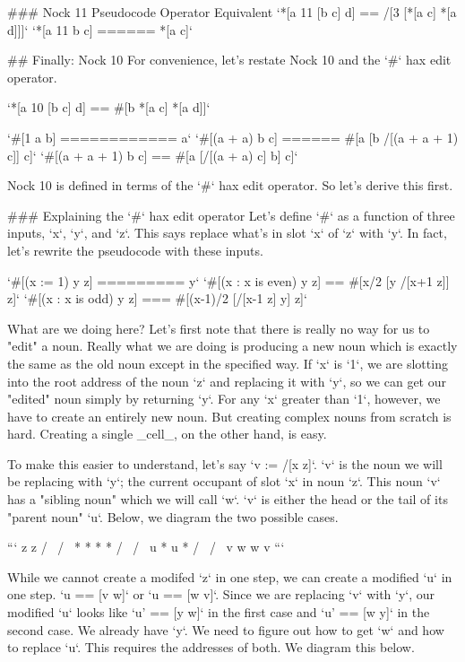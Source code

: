 \documentclass[twoside]{article}
\begin{document}
### Nock 11 Pseudocode Operator Equivalent
`*[a 11 [b c] d] == /[3 [*[a c] *[a d]]]`  
`*[a 11 b c] ====== *[a c]`

## Finally: Nock 10
For convenience, let's restate Nock 10 and the `#` hax edit operator.

`*[a 10 [b c] d] ==  #[b *[a c] *[a d]]`  

`#[1 a b] ============ a`  
`#[(a + a) b c] ====== #[a [b /[(a + a + 1) c]] c]`  
`#[(a + a + 1) b c] == #[a [/[(a + a) c] b] c]`  

Nock 10 is defined in terms of the `#` hax edit operator. So let's derive this first.

### Explaining the `#` hax edit operator
Let's define `#` as a function of three inputs, `x`, `y`, and `z`. This says replace what's in slot `x` of `z` with `y`. In fact, let's rewrite the pseudocode with these inputs.

`#[(x := 1) y z] ========= y`  
`#[(x : x is even) y z] == #[x/2 [y /[x+1 z]] z]`  
`#[(x : x is odd) y z] === #[(x-1)/2 [/[x-1 z] y] z]`  


What are we doing here? Let's first note that there is really no way for us to "edit" a noun. Really what we are doing is producing a new noun which is exactly the same as the old noun except in the specified way. If `x` is `1`, we are slotting into the root address of the noun `z` and replacing it with `y`, so we can get our "edited" noun simply by returning `y`. For any `x` greater than `1`, however, we have to create an entirely new noun. But creating complex nouns from scratch is hard. Creating a single _cell_, on the other hand, is easy.

To make this easier to understand, let's say `v := /[x z]`. `v` is the noun we will be replacing with `y`; the current occupant of slot `x` in noun `z`.  This noun `v` has a "sibling noun" which we will call `w`. `v` is either the head or the tail of its "parent noun" `u`. Below, we diagram the two possible cases.

```
      z              z
     / \            / \
    *   *          *   *
   / \            / \
  u   *          u   *
 / \            / \
v   w          w   v
```

While we cannot create a modifed `z` in one step, we can create a modified `u` in one step. `u == [v w]` or `u == [w v]`. Since we are replacing `v` with `y`, our modified `u` looks like `u' == [y w]` in the first case and `u' == [w y]` in the second case. We already have `y`. We need to figure out how to get `w` and how to replace `u`. This requires the addresses of both. We diagram this below.
\end{document}
